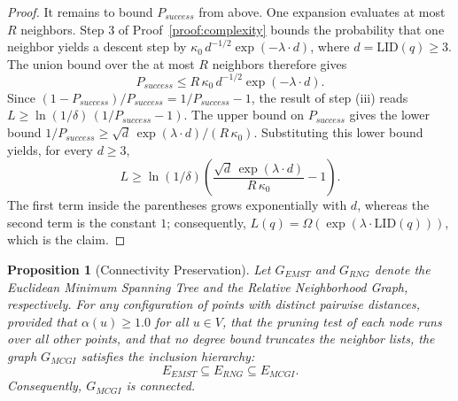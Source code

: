 \documentclass{article}
\theoremstyle{plain}
\newtheorem{proposition}[theorem]{Proposition}
\theoremstyle{definition}
\theoremstyle{remark}
\begin{document}
\begin{proof}
It remains to bound $P_{success}$ from above. One expansion evaluates at most $R$ neighbors. Step 3 of Proof~\ref{proof:complexity} bounds the probability that one neighbor yields a descent step by $\kappa_0\, d^{-1/2} \exp(-\lambda \cdot d)$, where $d = \text{LID}(q) \ge 3$. The union bound over the at most $R$ neighbors therefore gives
\begin{equation}
    P_{success} \le R\, \kappa_0\, d^{-1/2} \exp(-\lambda \cdot d).
\end{equation}
Since $(1 - P_{success})/P_{success} = 1/P_{success} - 1$, the result of step (iii) reads $L \ge \ln(1/\delta)\,(1/P_{success} - 1)$. The upper bound on $P_{success}$ gives the lower bound $1/P_{success} \ge \sqrt{d}\, \exp(\lambda \cdot d)/(R\, \kappa_0)$. Substituting this lower bound yields, for every $d \ge 3$,
\begin{equation}
    L \ge \ln(1/\delta) \left( \frac{\sqrt{d}\, \exp(\lambda \cdot d)}{R\, \kappa_0} - 1 \right).
\end{equation}
The first term inside the parentheses grows exponentially with $d$, whereas the second term is the constant $1$; consequently, $L(q) = \Omega(\exp(\lambda \cdot \text{LID}(q)))$, which is the claim.
\end{proof}

\begin{proposition}[Connectivity Preservation]
\label{proof:connectivity}
Let $G_{EMST}$ and $G_{RNG}$ denote the Euclidean Minimum Spanning Tree and the Relative Neighborhood Graph, respectively. For any configuration of points with distinct pairwise distances, provided that $\alpha(u) \ge 1.0$ for all $u \in V$, that the pruning test of each node runs over all other points, and that no degree bound truncates the neighbor lists, the graph $G_{MCGI}$ satisfies the inclusion hierarchy:
\begin{equation}
    E_{EMST} \subseteq E_{RNG} \subseteq E_{MCGI}.
\end{equation}
Consequently, $G_{MCGI}$ is connected.
\end{proposition}
\end{document}
